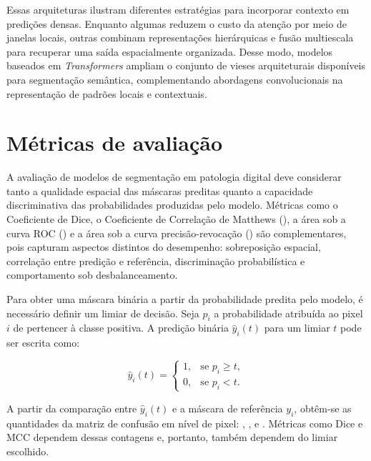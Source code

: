 Essas arquiteturas ilustram diferentes estratégias para incorporar contexto em predições densas. Enquanto algumas reduzem o custo da atenção por meio de janelas locais, outras combinam representações hierárquicas e fusão multiescala para recuperar uma saída espacialmente organizada. Desse modo, modelos baseados em \textit{Transformers} ampliam o conjunto de vieses arquiteturais disponíveis para segmentação semântica, complementando abordagens convolucionais na representação de padrões locais e contextuais.

\section{Métricas de avaliação}\label{sec:metricas_reprodutibilidade} 

A avaliação de modelos de segmentação em patologia digital deve considerar tanto a qualidade espacial das máscaras preditas quanto a capacidade discriminativa das probabilidades produzidas pelo modelo. Métricas como o Coeficiente de Dice, o Coeficiente de Correlação de Matthews (), a área sob a curva ROC () e a área sob a curva precisão-revocação () são complementares, pois capturam aspectos distintos do desempenho: sobreposição espacial, correlação entre predição e referência, discriminação probabilística e comportamento sob desbalanceamento. 

Para obter uma máscara binária a partir da probabilidade predita pelo modelo, é necessário definir um limiar de decisão. Seja $p_i$ a probabilidade atribuída ao pixel $i$ de pertencer à classe positiva. A predição binária $\hat{y}_i(t)$ para um limiar $t$ pode ser escrita como: 

\begin{equation}\label{eq:threshold-prediction} \hat{y}_i(t) = \begin{cases} 1, & \text{se } p_i \geq t,\\ 0, & \text{se } p_i < t. \end{cases} \end{equation} 

A partir da comparação entre $\hat{y}_i(t)$ e a máscara de referência $y_i$, obtêm-se as quantidades da matriz de confusão em nível de pixel: , ,  e . Métricas como Dice e MCC dependem dessas contagens e, portanto, também dependem do limiar escolhido. 

